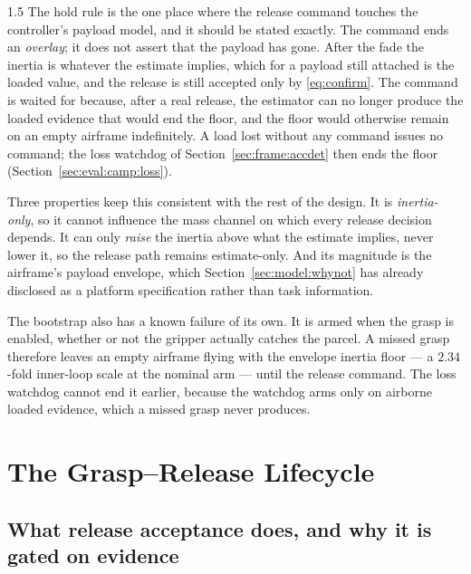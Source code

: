 \begin{spacing}{1.5}
The hold rule is the one place where the release command touches the
controller's payload model, and it should be stated exactly. The command ends an
\emph{overlay}; it does not assert that the payload has gone. After the fade the
inertia is whatever the estimate implies, which for a payload still attached is
the loaded value, and the release is still accepted only by
\eqref{eq:confirm}. The command is waited for because, after a real release, the
estimator can no longer produce the loaded evidence that would end the floor, and
the floor would otherwise remain on an empty airframe indefinitely. A load lost
without any command issues no command; the loss watchdog of
Section~\ref{sec:frame:accdet} then ends the floor
(Section~\ref{sec:eval:camp:loss}).

Three properties keep this consistent with the rest of the design. It is
\emph{inertia-only}, so it cannot influence the mass channel on which every
release decision depends. It can only \emph{raise} the inertia above what the
estimate implies, never lower it, so the release path remains estimate-only. And its magnitude is the airframe's
payload envelope, which Section~\ref{sec:model:whynot} has already disclosed as a
platform specification rather than task information.

The bootstrap also has a known failure of its own. It is armed when the grasp is
enabled, whether or not the gripper actually catches the parcel. A missed grasp
therefore leaves an empty airframe flying with the envelope inertia floor --- a
$2.34$-fold inner-loop scale at the nominal arm --- until the release command.
The loss watchdog cannot end it earlier, because the watchdog arms only on
airborne loaded evidence, which a missed grasp never produces.

\section{The Grasp--Release Lifecycle}\label{sec:frame:lifecycle}

\subsection{What release acceptance does, and why it is gated on evidence}\label{sec:frame:why-eventless}


\end{spacing}
